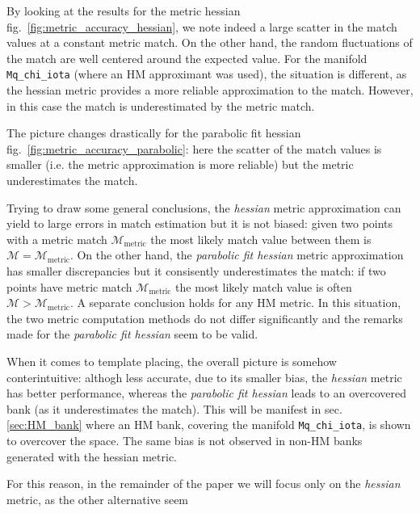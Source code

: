 \documentclass[twocolumn,showpacs,preprintnumbers,nofootinbib,prd,
superscriptaddress,10pt]{revtex4-2}
\begin{document}
By looking at the results for the metric hessian fig.~\ref{fig:metric_accuracy_hessian}, we note indeed a large scatter in the match values at a constant metric match. On the other hand, the random fluctuations of the match are well centered around the expected value.
For the manifold \texttt{Mq\_chi\_iota} (where an HM approximant was used), the situation is different, as the hessian metric provides a more reliable approximation to the match. However, in this case the match is underestimated by the metric match.

The picture changes drastically for the parabolic fit hessian fig.~\ref{fig:metric_accuracy_parabolic}: here the scatter of the match values is smaller (i.e. the metric approximation is more reliable) but the metric underestimates the match.

Trying to draw some general conclusions, the {\it hessian} metric approximation can yield to large errors in match estimation but it is not biased: given two points with a metric match $\mathcal{M}_{\text{metric}}$ the most likely match value between them is $\mathcal{M} = \mathcal{M}_{\text{metric}}$. 
On the other hand, the {\it parabolic fit hessian} metric approximation has smaller discrepancies but it consisently underestimates the match: if two points have metric match $\mathcal{M}_{\text{metric}}$ the most likely match value is often $\mathcal{M} > \mathcal{M}_{\text{metric}}$.
A separate conclusion holds for any HM metric. In this situation, the two metric computation methods do not differ significantly and the remarks made for the {\it parabolic fit hessian} seem to be valid.

When it comes to template placing, the overall picture is somehow conterintuitive: althogh less accurate, due to its smaller bias, the {\it hessian} metric has better performance, whereas the {\it parabolic fit hessian} leads to an overcovered bank (as it underestimates the match). This will be manifest in sec.\ref{sec:HM_bank} where an HM bank, covering the manifold \texttt{Mq\_chi\_iota}, is shown to overcover the space. The same bias is not observed in non-HM banks generated with the hessian metric.

For this reason, in the remainder of the paper we will focus only on the {\it hessian} metric, as the other alternative seem
\end{document}
